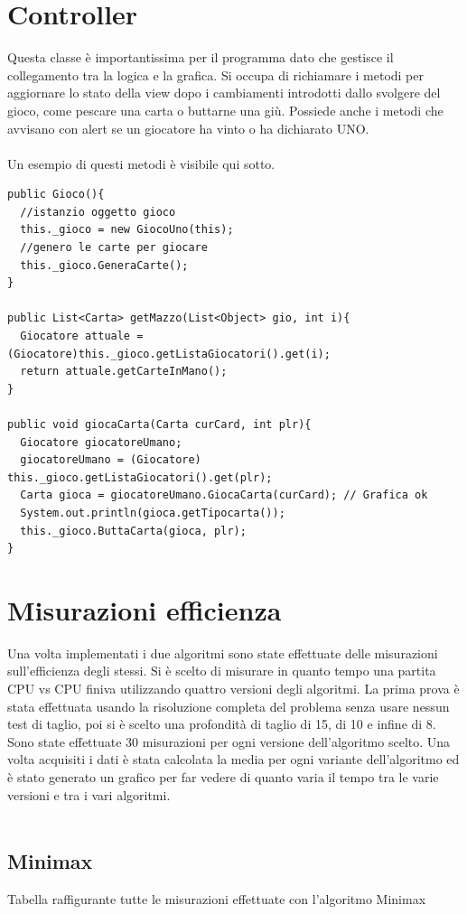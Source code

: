 \newpage		
\section{Controller}
	Questa classe è importantissima per il programma dato che gestisce il collegamento tra la logica e la grafica. Si occupa di richiamare i metodi per aggiornare lo stato della view dopo i cambiamenti introdotti dallo svolgere del gioco, come pescare una carta o buttarne una giù. Possiede anche i metodi che avvisano con alert se un giocatore ha vinto o ha dichiarato UNO.\\\\
	Un esempio di questi metodi è visibile qui sotto.

\begin{lstlisting}
public Gioco(){
  //istanzio oggetto gioco
  this._gioco = new GiocoUno(this);
  //genero le carte per giocare
  this._gioco.GeneraCarte();
}

public List<Carta> getMazzo(List<Object> gio, int i){
  Giocatore attuale = (Giocatore)this._gioco.getListaGiocatori().get(i);
  return attuale.getCarteInMano();	
}

public void giocaCarta(Carta curCard, int plr){ 	
  Giocatore giocatoreUmano;
  giocatoreUmano = (Giocatore) this._gioco.getListaGiocatori().get(plr);
  Carta gioca = giocatoreUmano.GiocaCarta(curCard); // Grafica ok 
  System.out.println(gioca.getTipocarta());
  this._gioco.ButtaCarta(gioca, plr);	
}
\end{lstlisting}
\newpage	
\section{Misurazioni efficienza}
	Una volta implementati i due algoritmi sono state effettuate delle misurazioni sull'efficienza degli stessi. Si è scelto di misurare in quanto tempo una partita CPU vs CPU finiva utilizzando quattro versioni degli algoritmi. La prima prova è stata effettuata usando la risoluzione completa del problema senza usare nessun test di taglio, poi si è scelto una profondità di taglio di 15, di 10 e infine di 8. Sono state effettuate 30 misurazioni per ogni versione dell'algoritmo scelto. Una volta acquisiti i dati è stata calcolata la media per ogni variante dell'algoritmo ed è stato generato un grafico per far vedere di quanto varia il tempo tra le varie versioni e tra i vari algoritmi.\\\\
	
	\subsection{Minimax}
	Tabella raffigurante tutte le misurazioni effettuate con l'algoritmo Minimax\\
	
